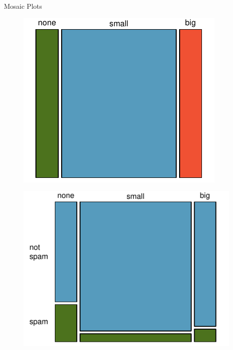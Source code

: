 \documentclass[12pt,a4paper]{beamer}
\begin{document}
\begin{frame}{Mosaic Plots}
		\begin{figure}
		 	\centering
			\begin{minipage}{.5\textwidth}
			  \centering
		\includegraphics[width=\textwidth]{figures/emailSpamNumberMosaicPlot/emailNumberMosaic}
		\end{minipage}%
		\begin{minipage}{.5\textwidth}
		  \centering
	\includegraphics[width=\textwidth]{figures/emailSpamNumberMosaicPlot/emailSpamNumberMosaic}
	\label{emailSpamNumberSegBarSta}
	\end{minipage}
	\end{figure}

\end{frame}
\end{document}
